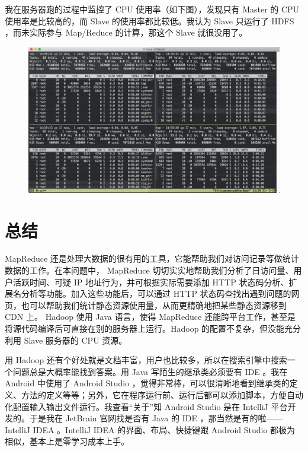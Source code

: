 \documentclass{article}
\begin{document}
我在服务器跑的过程中监控了 CPU 使用率（如下图），发现只有 Master 的 CPU 使用率是比较高的，而 Slave 的使用率都比较低。我认为 Slave 只运行了 HDFS ，而未实际参与 Map/Reduce 的计算，那这个 Slave 就很没用了。

\begin{figure}[!ht]
\centering
\includegraphics[scale=0.35]{image/18.png}
\end{figure}

\section{总结}

MapReduce 还是处理大数据的很有用的工具，它能帮助我们对访问记录等做统计数据的工作。在本问题中， MapReduce 切切实实地帮助我们分析了日访问量、用户活跃时间、可疑 IP 地址行为，并可根据实际需要添加 HTTP 状态码分析、扩展名分析等功能。加入这些功能后，可以通过 HTTP 状态码查找出遇到问题的网页，也可以帮助我们统计静态资源使用量，从而更精确地把某些静态资源移到 CDN 上。 Hadoop 使用 Java 语言，使得 MapReduce 还能跨平台工作，甚至是将源代码编译后可直接在别的服务器上运行。Hadoop 的配置不复杂，但没能充分利用 Slave 服务器的 CPU 资源。

用 Hadoop 还有个好处就是文档丰富，用户也比较多，所以在搜索引擎中搜索一个问题总是大概率能找到答案。用 Java 写陌生的继承类必须要有 IDE 。我在 Android 中使用了 Android Studio ，觉得非常棒，可以很清晰地看到继承类的定义、方法的定义等等；另外，它在程序运行前、运行后都可以添加脚本，方便自动化配置输入输出文件运行。我查看“关于”知 Android Studio 是在 IntelliJ 平台开发的。于是我在 JetBrain 官网找是否有 Java 的 IDE ，那当然是有的啦——IntelliJ IDEA 。IntelliJ IDEA 的界面、布局、快捷键跟 Android Studio 都极为相似，基本上是零学习成本上手。
\end{document}
